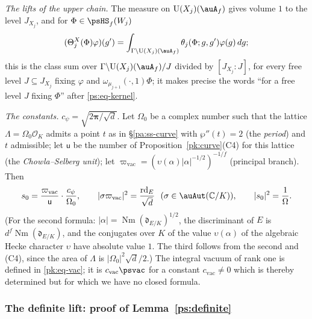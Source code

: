 \documentclass[10pt]{amsart}
\theoremstyle{definition}
\theoremstyle{remark}
\newcommand{\C}{\mathbb C}
\providecommand{\auNm}{\operatorname{Nm}}
\providecommand{\auO}{\mathcal O}
\providecommand{\auU}{\mathrm U}
\providecommand{\aurd}{\mathrm{rd}_E}
\begin{document}
\emph{The lifts of the upper chain.} The measure on $\auU(X_j)(\auA_f)$ gives volume $1$ to the
level $J_{X_j}$, and for $\Phi\in\psHS_f(W_j)$
\begin{equation}\label{pk:eq-lift}
(\Theta^X_j(\Phi)\varphi)(g')=\int_{\Gamma\backslash\auU(X_j)(\auA_f)}\theta_j(\Phi;g,g')\varphi(g)\,dg;
\end{equation}
this is the class sum over $\Gamma\backslash\auU(X_j)(\auA_f)/J$ divided by $[J_{X_j}:J]$, for
every free level $J\subseteq J_{X_j}$ fixing $\varphi$ and $\omega_{\mu_{j+1}}(\cdot,1)\Phi$; it
makes precise the words ``for a free level $J$ fixing $\Phi$'' after \eqref{ps:eq-kernel}.

\emph{The constants.} $c_\psi=\sqrt{2\boldsymbol\pi/\sqrt d}$. Let $\Omega_0$ be a complex number
such that the lattice $\Lambda=\Omega_0\auO_K$ admits a point $t$ as in \S\ref{pa:ss-curve} with
$\wp''(t)=2$ (the \emph{period}) and $t$ admissible; let $\mathsf u$ be the number of
Proposition~\ref{pk:curve}(C4) for this lattice (the \emph{Chowla--Selberg unit}); let
$\varpi_{\mathrm{vac}}=(\upsilon(\alpha)|\alpha|^{-1/2})^{-1/f}$ (principal branch). Then
\begin{equation}\label{pk:eq-s0}
s_0=\frac{\varpi_{\mathrm{vac}}}{\mathsf u}\cdot\frac{c_\psi}{\Omega_0},\qquad|\sigma
\varpi_{\mathrm{vac}}|^2=\frac{\aurd}{\sqrt d}\ \ (\sigma\in\auAut(\C/K)),\qquad|s_0|^2=\frac1\Omega .
\end{equation}
(For the second formula: $|\alpha|=\auNm(\mathfrak d_{E/K})^{1/2}$, the discriminant of $E$ is
$d^f\auNm(\mathfrak d_{E/K})$, and the conjugates over $K$ of the value $\upsilon(\alpha)$ of the
algebraic Hecke character $\upsilon$ have absolute value $1$. The third follows from the second
and (C4), since the area of $\Lambda$ is $|\Omega_0|^2\sqrt d/2$.) The integral vacuum of rank one
is defined in \eqref{pk:eq-vac}; it is $c_{\mathrm{vac}}\psvac$ for a constant
$c_{\mathrm{vac}}\ne0$ which is thereby determined but for which we have no closed formula.

\subsubsection{The definite lift: proof of Lemma~\ref{ps:definite}}\label{pk:ss-definite}
\end{document}
